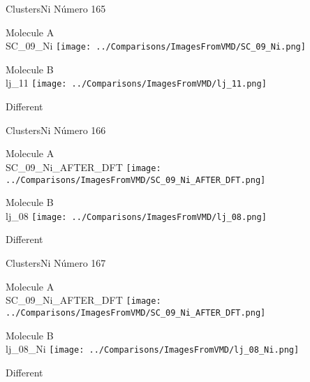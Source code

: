 \vtab[-3cm]
\begin{center}
{\large ClustersNi \tab Número 165}
\end{center}
\begin{multicols}{2}
\begin{center}
Molecule A \\ 
SC\_09\_Ni
\texttt{[image: ../Comparisons/ImagesFromVMD/SC\_09\_Ni.png]}
\\
\vtab

\columnbreak
Molecule B \\ 
lj\_11
\texttt{[image: ../Comparisons/ImagesFromVMD/lj\_11.png]}
\\
\vtab


\end{center}
\end{multicols}
\begin{center}
\textcolor{NavyBlue}{\Large Different}
\end{center}

 \newpage

\vtab[-3cm]
\begin{center}
{\large ClustersNi \tab Número 166}
\end{center}
\begin{multicols}{2}
\begin{center}
Molecule A \\ 
SC\_09\_Ni\_AFTER\_DFT
\texttt{[image: ../Comparisons/ImagesFromVMD/SC\_09\_Ni\_AFTER\_DFT.png]}
\\
\vtab

\columnbreak
Molecule B \\ 
lj\_08
\texttt{[image: ../Comparisons/ImagesFromVMD/lj\_08.png]}
\\
\vtab


\end{center}
\end{multicols}
\begin{center}
\textcolor{NavyBlue}{\Large Different}
\end{center}

 \newpage

\vtab[-3cm]
\begin{center}
{\large ClustersNi \tab Número 167}
\end{center}
\begin{multicols}{2}
\begin{center}
Molecule A \\ 
SC\_09\_Ni\_AFTER\_DFT
\texttt{[image: ../Comparisons/ImagesFromVMD/SC\_09\_Ni\_AFTER\_DFT.png]}
\\
\vtab

\columnbreak
Molecule B \\ 
lj\_08\_Ni
\texttt{[image: ../Comparisons/ImagesFromVMD/lj\_08\_Ni.png]}
\\
\vtab


\end{center}
\end{multicols}
\begin{center}
\textcolor{NavyBlue}{\Large Different}
\end{center}

